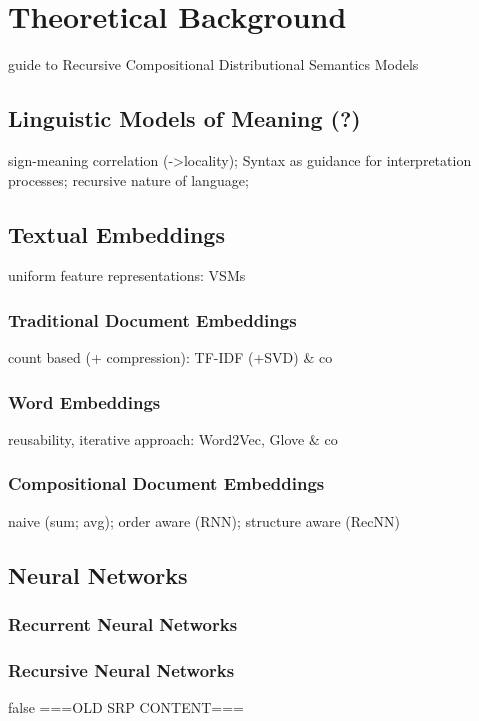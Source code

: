 \section{Theoretical Background}
guide to Recursive Compositional Distributional Semantics Models

\subsection{Linguistic Models of Meaning (?)}
sign-meaning correlation (->locality); Syntax as guidance for interpretation processes; recursive nature of language;

\subsection{Textual Embeddings}
uniform feature representations: VSMs

\subsubsection{Traditional Document Embeddings}
count based (+ compression): TF-IDF (+SVD) \& co

\subsubsection{Word Embeddings}
reusability, iterative approach: Word2Vec, Glove \& co

\subsubsection{Compositional Document Embeddings}
naive (sum; avg); order aware (RNN); structure aware (RecNN)

\subsection{Neural Networks}

\subsubsection{Recurrent Neural Networks}

\subsubsection{Recursive Neural Networks}


\if false
===OLD SRP CONTENT===


